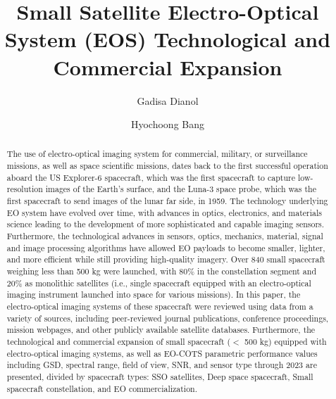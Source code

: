 \documentclass[final,5p,times,sort&compress,twocolumn]{elsarticle}
\begin{document}
\begin{frontmatter}

\title{Small Satellite Electro-Optical System (EOS) Technological and Commercial Expansion}

\author[1]{Gadisa Dianol}
\author[1]{Hyochoong Bang}

\begin{abstract}
The use of electro-optical imaging system for commercial, military, or surveillance missions, as well as space scientific missions, dates back to the first successful operation aboard the US Explorer-6 spacecraft, which was the first spacecraft to capture low-resolution images of the Earth's surface, and the Luna-3 space probe, which was the first spacecraft to send images of the lunar far side, in 1959. The technology underlying EO system have evolved over time, with advances in optics, electronics, and materials science leading to the development of more sophisticated and capable imaging sensors. Furthermore, the technological advances in sensors, optics, mechanics, material, signal and image processing algorithms have allowed EO payloads to become smaller, lighter, and more efficient while still providing high-quality imagery.
Over 840 small spacecraft weighing less than 500 kg were launched, with 80\% in the constellation segment and 20\% as monolithic satellites (i.e., single spacecraft equipped with an electro-optical imaging instrument launched into space for various missions). In this paper, the electro-optical imaging systems of these spacecraft were reviewed using data from a variety of sources, including peer-reviewed journal publications, conference proceedings, mission webpages, and other publicly available satellite databases. 
Furthermore, the technological and commercial expansion of small spacecraft ($<$ 500 kg) equipped with electro-optical imaging systems, as well as EO-COTS parametric performance values including GSD, spectral range, field of view, SNR, and sensor type through 2023 are presented, divided by spacecraft types: SSO satellites, Deep space spacecraft, Small spacecraft constellation, and EO commercialization.
\end{abstract}


\end{frontmatter}
\end{document}
